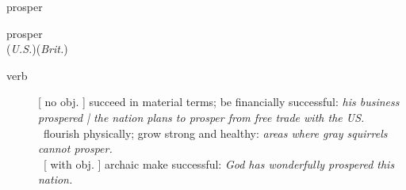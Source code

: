 \documentclass[avery5372, grid]{flashcards}
\begin{document}
\begin{flashcard}{\Huge prosper}
	\begin{center}
		{\LARGE pros\textbullet per}\\
		(\textit{U.S.})\hspace{0.25cm}(\textit{Brit.})
	\end{center}
	\begin{description}
		
		\item[verb] %
			[ no obj. ]
			succeed in material terms; be financially successful: \textit{his business prospered | the nation plans to prosper from free trade with the US.}\\
			\textbullet\ flourish physically; grow strong and healthy: \textit{areas where gray squirrels cannot prosper.}\\
			\textbullet\ [ with obj. ] archaic make successful: \textit{God has wonderfully prospered this nation.}\\
			
			
			
		
			
			
			

\end{description}
\end{flashcard}
\end{document}
